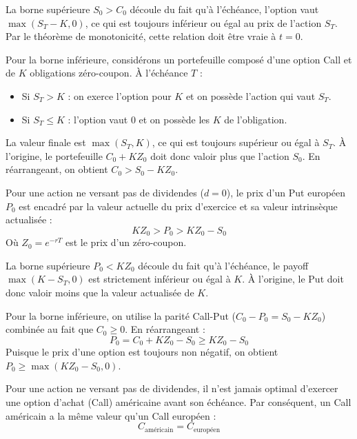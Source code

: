 \begin{proofbox}
La borne supérieure $S_0 > C_0$ découle du fait qu'à l'échéance, l'option vaut $\max(S_T - K, 0)$, ce qui est toujours inférieur ou égal au prix de l'action $S_T$. Par le théorème de monotonicité, cette relation doit être vraie à $t = 0$.

Pour la borne inférieure, considérons un portefeuille composé d'une option Call et de $K$ obligations zéro-coupon. À l'échéance $T$ :
\begin{itemize}[label=$\rightarrow$]
    \item Si $S_T > K$ : on exerce l'option pour $K$ et on possède l'action qui vaut $S_T$.
    \item Si $S_T \leq K$ : l'option vaut $0$ et on possède les $K$ de l'obligation.
\end{itemize}
La valeur finale est $\max(S_T, K)$, ce qui est toujours supérieur ou égal à $S_T$. À l'origine, le portefeuille $C_0 + K Z_0$ doit donc valoir plus que l'action $S_0$. En réarrangeant, on obtient $C_0 > S_0 - K Z_0$.
\end{proofbox}

\begin{theorembox}
Pour une action ne versant pas de dividendes ($d = 0$), le prix d'un Put européen $P_0$ est encadré par la valeur actuelle du prix d'exercice et sa valeur intrinsèque actualisée :
\begin{equation*}
    K Z_0 > P_0 > K Z_0 - S_0
\end{equation*}
Où $Z_0 = e^{-rT}$ est le prix d'un zéro-coupon.
\end{theorembox}

\begin{proofbox}
La borne supérieure $P_0 < K Z_0$ découle du fait qu'à l'échéance, le payoff $\max(K - S_T, 0)$ est strictement inférieur ou égal à $K$. À l'origine, le Put doit donc valoir moins que la valeur actualisée de $K$.

Pour la borne inférieure, on utilise la parité Call-Put ($C_0 - P_0 = S_0 - K Z_0$) combinée au fait que $C_0 \ge 0$. En réarrangeant :
\begin{equation*}
    P_0 = C_0 + K Z_0 - S_0 \ge K Z_0 - S_0
\end{equation*}
Puisque le prix d'une option est toujours non négatif, on obtient $P_0 \ge \max(K Z_0 - S_0, 0)$.
\end{proofbox}

\begin{theorembox}
Pour une action ne versant pas de dividendes, il n'est jamais optimal d'exercer une option d'achat (Call) américaine avant son échéance. Par conséquent, un Call américain a la même valeur qu'un Call européen :
\begin{equation*}
    C_{\text{américain}} = C_{\text{européen}}
\end{equation*}
\end{theorembox}

